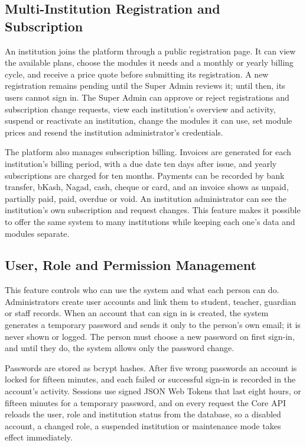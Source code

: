 \subsection{Multi-Institution Registration and Subscription}
An institution joins the platform through a public registration page. It can view the available plans, choose the modules it needs and a monthly or yearly billing cycle, and receive a price quote before submitting its registration. A new registration remains pending until the Super Admin reviews it; until then, its users cannot sign in. The Super Admin can approve or reject registrations and subscription change requests, view each institution's overview and activity, suspend or reactivate an institution, change the modules it can use, set module prices and resend the institution administrator's credentials.

The platform also manages subscription billing. Invoices are generated for each institution's billing period, with a due date ten days after issue, and yearly subscriptions are charged for ten months. Payments can be recorded by bank transfer, bKash, Nagad, cash, cheque or card, and an invoice shows as unpaid, partially paid, paid, overdue or void. An institution administrator can see the institution's own subscription and request changes. This feature makes it possible to offer the same system to many institutions while keeping each one's data and modules separate.

\subsection{User, Role and Permission Management}
This feature controls who can use the system and what each person can do. Administrators create user accounts and link them to student, teacher, guardian or staff records. When an account that can sign in is created, the system generates a temporary password and sends it only to the person's own email; it is never shown or logged. The person must choose a new password on first sign-in, and until they do, the system allows only the password change.

Passwords are stored as bcrypt hashes. After five wrong passwords an account is locked for fifteen minutes, and each failed or successful sign-in is recorded in the account's activity. Sessions use signed JSON Web Tokens that last eight hours, or fifteen minutes for a temporary password, and on every request the Core API reloads the user, role and institution status from the database, so a disabled account, a changed role, a suspended institution or maintenance mode takes effect immediately.

